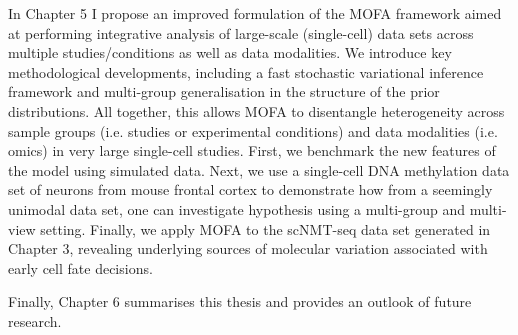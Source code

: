 In Chapter 5 I propose an improved formulation of the MOFA framework aimed at performing integrative analysis of large-scale (single-cell) data sets across multiple studies/conditions as well as data modalities. We introduce key methodological developments, including a fast stochastic variational inference framework and multi-group generalisation in the structure of the prior distributions. All together, this allows MOFA to  disentangle heterogeneity across sample groups (i.e. studies or experimental conditions) and data modalities (i.e. omics) in very large single-cell studies. First, we benchmark the new features of the model using simulated data. Next, we use a single-cell DNA methylation data set of neurons from mouse frontal cortex to demonstrate how from a seemingly unimodal data set, one can investigate hypothesis using a multi-group and multi-view setting. Finally, we apply MOFA to the scNMT-seq data set generated in Chapter 3, revealing underlying sources of molecular variation associated with early cell fate decisions.

Finally, Chapter 6 summarises this thesis and provides an outlook of future research.
